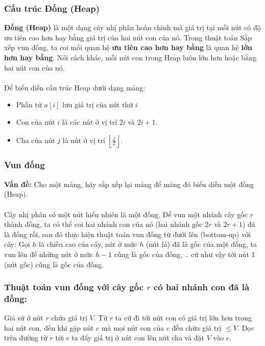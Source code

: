 \documentclass[]{article}
\begin{document}
\subsubsection{Cấu trúc Đống (Heap)}
\textbf{Đống (Heap)} là một dạng cây nhị phân hoàn chỉnh mà giá trị tại mỗi nút có độ ưu tiên cao hơn hay bằng giá trị của hai nút con của nó. Trong thuật toán Sắp xếp vun đống, ta coi mối quan hệ \textbf{ưu tiên cao hơn hay bằng} là quan hệ \textbf{lớn hơn hay bằng}.\cite{LMHoang} Nói cách khác, mỗi nút con trong Heap luôn lớn hơn hoặc bằng hai nút con của nó.
\\\\
Để biểu diễn cấu trúc Heap dưới dạng mảng:
\begin{itemize}
\item Phần tử $a[i]$ lưu giá trị của nút thứ $i$
\item Con của nút $i$ là các nút ở vị trí $2i$ và $2i + 1$.
\item Cha của nút $j$ là nút ở vị trí $\displaystyle \left\lfloor\frac{j}{2}\right\rfloor$.
\end{itemize}

\subsubsection{Vun đống}
\textbf{Vấn đề:} Cho một mảng, hãy sắp xếp lại mảng để mảng đó biểu diễn một đống (Heap).
\\\\
Cây nhị phân có một nút hiển nhiên là một đống. Để vun một nhánh cây gốc $r$ thành đống, ta có thể coi hai nhánh con của nó (hai nhánh gốc $2r$ và $2r + 1$) đã là đống rồi, sau đó thực hiện thuật toán vun đống từ dưới lên (bottom-up) với cây: Gọi $h$ là chiều cao của cây, nút ở mức $h$ (nút lá) đã là gốc của một đống, ta vun lên để những nút ở mức $h - 1$ cũng là gốc của đống, .. cứ như vậy tới nút 1 (nút gốc) cũng là gốc của đống.\cite{LMHoang}
\subsubsection{Thuật toán vun đống với cây gốc $r$ có hai nhánh con đã là đống:}
Giả sử ở nút $r$ chứa giá trị $V$. Từ $r$ ta cứ đi tới nút con có giá trị lớn hơn trong hai nút con, đến khi gặp nút $c$ mà mọi nút con của $c$ đều chứa giá trị $\leq V$. Dọc trên đường từ $r$ tới $c$ ta đẩy giá trị ở nút con lên nút cha và đặt $V$ vào $c$.\cite{LMHoang}
\end{document}
